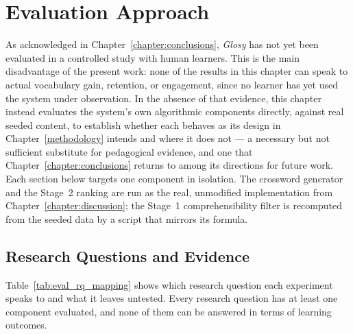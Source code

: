 \section{Evaluation Approach}
\label{sec:eval_approach}
    As acknowledged in Chapter~\ref{chapter:conclusions}, \textit{Glosy} has not yet been evaluated in a controlled study with human learners. This is the main disadvantage of the present work: none of the results in this chapter can speak to actual vocabulary gain, retention, or engagement, since no learner has yet used the system under observation. In the absence of that evidence, this chapter instead evaluates the system's own algorithmic components directly, against real seeded content, to establish whether each behaves as its design in Chapter~\ref{methodology} intends and where it does not --- a necessary but not sufficient substitute for pedagogical evidence, and one that Chapter~\ref{chapter:conclusions} returns to among its directions for future work. Each section below targets one component in isolation. The crossword generator and the Stage~2 ranking are run as the real, unmodified implementation from Chapter~\ref{chapter:discussion}; the Stage~1 comprehensibility filter is recomputed from the seeded data by a script that mirrors its formula.

    \subsection{Research Questions and Evidence}
    \label{subsec:eval_rq_mapping}
    Table~\ref{tab:eval_rq_mapping} shows which research question each experiment speaks to and what it leaves untested. Every research question has at least one component evaluated, and none of them can be answered in terms of learning outcomes.

